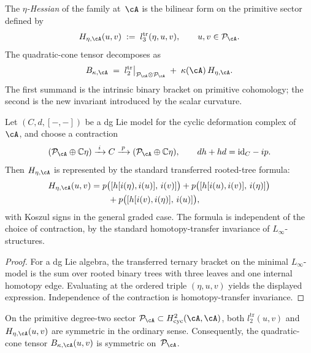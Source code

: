 \begin{definition}
\label{def:eta-hessian}
The \emph{$\eta$-Hessian} of the family at~$\cA$ is the bilinear form
on the primitive sector defined by
\[
H_{\eta,\cA}(u,v)
\;:=\;
l_3^{\mathrm{tr}}(\eta, u, v),
\qquad u, v \in \mathcal{P}_\cA.
\]
The quadratic-cone tensor decomposes as
\[
B_{\kappa,\cA}
\;=\;
l_2^{\mathrm{tr}}\big|_{\mathcal{P}_\cA \otimes \mathcal{P}_\cA}
\;+\;
\kappa(\cA)\, H_{\eta,\cA}.
\]
The first summand is the intrinsic binary bracket on primitive
cohomology; the second is the new invariant introduced by the scalar
curvature.
\end{definition}

\begin{proposition}
\label{prop:eta-hessian-transfer}
Let $(C, d, [-,-])$ be a dg Lie model for the cyclic deformation
complex of~$\cA$, and choose a contraction
\[
(\mathcal{P}_\cA \oplus \mathbb{C}\eta)
 \xrightarrow{\;i\;} C
 \xrightarrow{\;p\;} (\mathcal{P}_\cA \oplus \mathbb{C}\eta),
\qquad
dh + hd = \mathrm{id}_C - ip.
\]
Then $H_{\eta,\cA}$ is represented by the standard transferred
rooted-tree formula:
\begin{align*}
H_{\eta,\cA}(u,v)
&= p\bigl([h[i(\eta), i(u)],\, i(v)]\bigr)
 + p\bigl([h[i(u), i(v)],\, i(\eta)]\bigr) \\
&\qquad
 + p\bigl([h[i(v), i(\eta)],\, i(u)]\bigr),
\end{align*}
with Koszul signs in the general graded case. The formula is
independent of the choice of contraction, by the standard
homotopy-transfer invariance of $L_\infty$-structures.
\end{proposition}

\begin{proof}
For a dg Lie algebra, the transferred ternary bracket on the minimal
$L_\infty$-model is the sum over rooted binary trees with three leaves
and one internal homotopy edge. Evaluating at the ordered triple
$(\eta, u, v)$ yields the displayed expression. Independence of the
contraction is homotopy-transfer invariance.
\end{proof}

\begin{lemma}
\label{lem:shifted-symmetry-H}
On the primitive degree-two sector
$\mathcal{P}_\cA \subset H^2_{\mathrm{cyc}}(\cA, \cA)$, both
$l_2^{\mathrm{tr}}(u,v)$ and $H_{\eta,\cA}(u,v)$ are symmetric in the
ordinary sense. Consequently, the quadratic-cone tensor
$B_{\kappa,\cA}(u,v)$ is symmetric on~$\mathcal{P}_\cA$.
\end{lemma}

